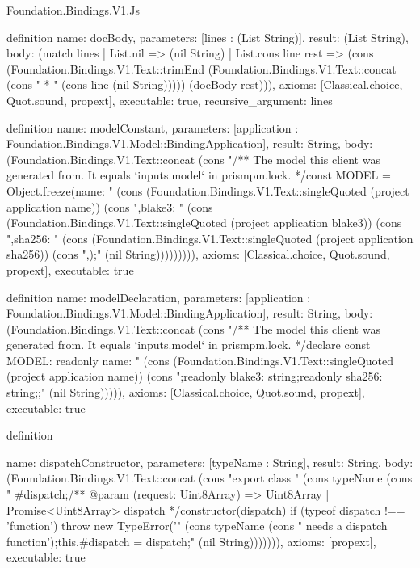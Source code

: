 \begin{lexlean}{Foundation.Bindings.V1.Js}
\begin{semanticmodule}
definition{
  name: docBody,
  parameters: [lines : (List String)],
  result: (List String),
  body: (match lines
    | List.nil => (nil String)
    | List.cons line rest => (cons (Foundation.Bindings.V1.Text::trimEnd (Foundation.Bindings.V1.Text::concat (cons " * " (cons line (nil String))))) (docBody rest))),
  axioms: [Classical.choice, Quot.sound, propext],
  executable: true,
  recursive_argument: lines
}

definition{
  name: modelConstant,
  parameters: [application : Foundation.Bindings.V1.Model::BindingApplication],
  result: String,
  body: (Foundation.Bindings.V1.Text::concat (cons "/** The model this client was generated from. It equals `inputs.model` in prismpm.lock. */\nexport const MODEL = Object.freeze({\n  name: " (cons (Foundation.Bindings.V1.Text::singleQuoted (project application name)) (cons ",\n  blake3: " (cons (Foundation.Bindings.V1.Text::singleQuoted (project application blake3)) (cons ",\n  sha256: " (cons (Foundation.Bindings.V1.Text::singleQuoted (project application sha256)) (cons ",\n});" (nil String))))))))),
  axioms: [Classical.choice, Quot.sound, propext],
  executable: true
}

definition{
  name: modelDeclaration,
  parameters: [application : Foundation.Bindings.V1.Model::BindingApplication],
  result: String,
  body: (Foundation.Bindings.V1.Text::concat (cons "/** The model this client was generated from. It equals `inputs.model` in prismpm.lock. */\nexport declare const MODEL: {\n  readonly name: " (cons (Foundation.Bindings.V1.Text::singleQuoted (project application name)) (cons ";\n  readonly blake3: string;\n  readonly sha256: string;\n};" (nil String))))),
  axioms: [Classical.choice, Quot.sound, propext],
  executable: true
}

definition{
  name: dispatchConstructor,
  parameters: [typeName : String],
  result: String,
  body: (Foundation.Bindings.V1.Text::concat (cons "export class " (cons typeName (cons " {\n  #dispatch;\n\n  /** @param {(request: Uint8Array) => Uint8Array | Promise<Uint8Array>} dispatch */\n  constructor(dispatch) {\n    if (typeof dispatch !== 'function') throw new TypeError('" (cons typeName (cons " needs a dispatch function');\n    this.#dispatch = dispatch;\n  }" (nil String))))))),
  axioms: [propext],
  executable: true
}

}
\end{semanticmodule}
\end{lexlean}

